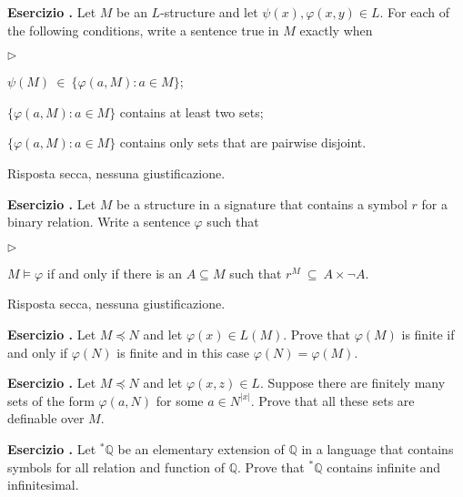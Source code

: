 \documentclass[10pt]{article}
\def\QQ{\mathds Q}
\newcommand{\labella}[1]{{\sf\footnotesize #1}\hfill}
\renewenvironment{itemize}
  {\begin{list}{$\triangleright$}{%
   \setlength{\parskip}{0mm}
   \setlength{\topsep}{0mm}
   \setlength{\rightmargin}{0mm}
   \setlength{\listparindent}{0mm}
   \setlength{\itemindent}{0mm}
   \setlength{\labelwidth}{3ex}
   \setlength{\itemsep}{0mm}
   \setlength{\parsep}{0mm}
   \setlength{\partopsep}{0mm}
   \setlength{\labelsep}{1ex}
   \setlength{\leftmargin}{\labelwidth+\labelsep}
   \let\makelabel\labella}}{%
   \vspace*{-.5\baselineskip}\end{list}}
\newcounter{ex}
\newenvironment{exercise}{\addtocounter{ex}{1}\textbf{Esercizio \theex.\quad}}{}
\begin{document}
\begin{exercise}
  Let $M$ be an $L$-structure and let $\psi(x), \varphi(x,y)\in L$. For each of the following conditions, write a sentence true in $M$ exactly when
  \begin{itemize}
  \item[a.] $\psi(M)\ \in\ \big\{\varphi(a,M): a\in M\big\}$;
  \item[b.] $\big\{\varphi(a,M): a\in M\big\}$ contains at least two sets;
  \item[c.] $\big\{\varphi(a,M): a\in M\big\}$ contains only sets that are pairwise disjoint.
  \end{itemize}
  Risposta secca, nessuna giustificazione.
\end{exercise}
  
\begin{exercise}
  Let $M$ be a structure in a signature that contains a symbol $r$ for a binary relation.
  Write a sentence $\varphi$ such that 
  \begin{itemize} 
  \item[a.] $M\models\varphi$ if and only if there is an $A\subseteq M$ such that $r^M\ \subseteq\ A\times\neg A$.
  \end{itemize}
  Risposta secca, nessuna giustificazione.
\end{exercise}


\begin{exercise}
  Let $M\preceq N$ and let $\varphi(x)\in L(M)$.
  Prove that $\varphi(M)$ is finite if and only if $\varphi(N)$ is finite and in this case $\varphi(N)=\varphi(M)$.
\end{exercise}
  
\begin{exercise}
  Let $M\preceq N$ and let $\varphi(x,z)\in L$.
  Suppose there are finitely many sets of the form $\varphi(a,N)$ for some $a\in N^{|x|}$.
  Prove that all these sets are definable over $M$.
\end{exercise}

\begin{exercise}
Let ${}^*\QQ$ be an elementary extension of $\QQ$ in a language that contains symbols for all relation and function of $\QQ$.
Prove that ${}^*\QQ$ contains infinite and infinitesimal.
\end{exercise}
\end{document}

